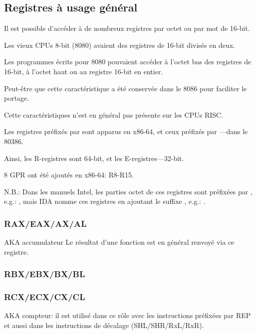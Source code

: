 \subsection{Registres à usage général}

Il est possible d'accéder à de nombreux registres par octet ou par mot
de 16-bit.

Les vieux CPUs 8-bit (8080) avaient des registres de 16-bit divisés en deux.

Les programmes écrits pour 8080 pouvaient accéder à l'octet bas des registres de
16-bit, à l'octet haut ou au registre 16-bit en entier.

Peut-être que cette caractéristique a été conservée dans le 8086 pour faciliter le
portage.

Cette caractéristiques n'est en général pas présente sur les CPUs \ac{RISC}.

Les registres préfixés par  sont apparus en x86-64, et ceux préfixés par ---dans le 80386.

Ainsi, les R-registres sont 64-bit, et les E-registres---32-bit.

8 \ac{GPR} ont été ajoutés en x86-64: R8-R15.

N.B.: 
Dans les manuels Intel, les parties octet de ces registres sont préfixées par ,
e.g.: , mais \ac{IDA} nomme ces registres en ajoutant le suffixe ,
e.g.: .

\subsubsection{RAX/EAX/AX/AL}

\ac{AKA} accumulateur
Le résultat d'une fonction est en général renvoyé via ce registre.

\subsubsection{RBX/EBX/BX/BL}

\subsubsection{RCX/ECX/CX/CL}

\ac{AKA} compteur:
il est utilisé dans ce rôle avec les instructions préfixées par REP et aussi dans
les instructions de décalage
(SHL/SHR/RxL/RxR).

